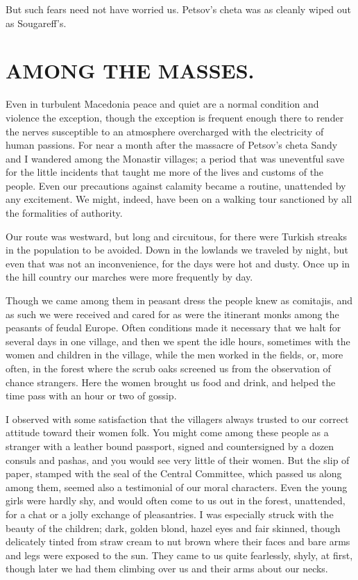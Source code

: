 \documentclass[a5paper,12pt]{book}
\begin{document}
But such fears need not have worried us. Petsov’s cheta was as cleanly wiped out as Sougareff’s.


\chapter{AMONG THE MASSES.}

Even in turbulent Macedonia peace and quiet are a normal condition and violence the exception, though the exception is frequent enough there to render the nerves susceptible to an atmosphere overcharged with the electricity of human passions. For near a month after the massacre of Petsov’s cheta Sandy and I wandered among the Monastir villages; a period that was uneventful save for the little incidents that taught me more of the lives and customs of the people. Even our precautions against calamity became a routine, unattended by any excitement. We might, indeed, have been on a walking tour sanctioned by all the formalities of authority.

Our route was westward, but long and circuitous, for there were Turkish streaks in the population to be avoided. Down in the lowlands we traveled by night, but even that was not an inconvenience, for the days were hot and dusty. Once up in the hill country our marches were more frequently by day.

Though we came among them in peasant dress the people knew as comitajis, and as such we were received and cared for as were the itinerant monks among the peasants of feudal Europe. Often conditions made it necessary that we halt for several days in one village, and then we spent the idle hours, sometimes with the women and children in the village, while the men worked in the fields, or, more often, in the forest where the scrub oaks screened us from the observation of chance strangers. Here the women brought us food and drink, and helped the time pass with an hour or two of gossip.

I observed with some satisfaction that the villagers always trusted to our correct attitude toward their women folk. You might come among these people as a stranger with a leather bound passport, signed and countersigned by a dozen consuls and pashas, and you would see very little of their women. But the slip of paper, stamped with the seal of the Central Committee, which passed us along among them, seemed also a testimonial of our moral characters. Even the young girls were hardly shy, and would often come to us out in the forest, unattended, for a chat or a jolly exchange of pleasantries.
I was especially struck with the beauty of the children; dark, golden blond, hazel eyes and fair skinned, though delicately tinted from straw cream to nut brown where their faces and bare arms and legs were exposed to the sun. They came to us quite fearlessly, shyly, at first, though later we had them climbing over us and their arms about our necks. 
\end{document}
